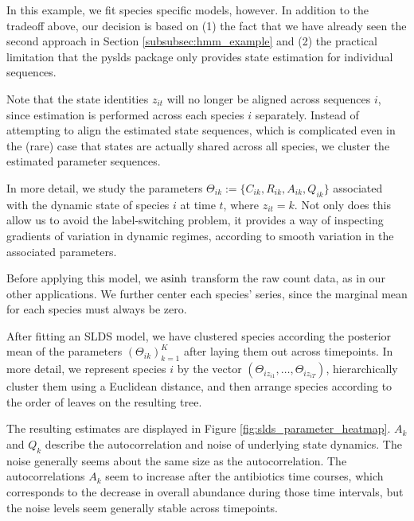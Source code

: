 In this example, we fit species specific models, however. In addition to the
tradeoff above, our decision is based on (1) the fact that we have already seen
the second approach in Section \ref{subsubsec:hmm_example} and (2) the practical
limitation that the pyslds package only provides state estimation for individual
sequences.

Note that the state identities $z_{it}$ will no longer be aligned across
sequences $i$, since estimation is performed across each species $i$ separately.
Instead of attempting to align the estimated state sequences, which is
complicated even in the (rare) case that states are actually shared across all
species, we cluster the estimated parameter sequences.

In more detail, we study the parameters $\Theta_{ik} := \{C_{ik}, R_{ik},
A_{ik}, Q_{ik}\}$ associated with the dynamic state of species $i$ at time $t$,
where $z_{it} = k$. Not only does this allow us to avoid the label-switching
problem, it provides a way of inspecting gradients of variation in dynamic
regimes, according to smooth variation in the associated parameters.

Before applying this model, we $\mathop\mathrm{asinh}$ transform the raw count data, as in our
other applications. We further center each species' series, since the marginal
mean for each species must always be zero.

After fitting an SLDS model, we have clustered species according the posterior
mean of the parameters $\left(\Theta_{ik}\right)_{k =1}^{K}$ after laying them
out across timepoints. In more detail, we represent species $i$ by the vector
$\left(\Theta_{i z_{i1}}, \dots, \Theta_{i z_{iT}}\right)$, hierarchically
cluster them using a Euclidean distance, and then arrange species according to
the order of leaves on the resulting tree.

The resulting estimates are displayed in Figure
\ref{fig:slds_parameter_heatmap}. $A_k$ and $Q_k$ describe the autocorrelation
and noise of underlying state dynamics. The noise generally seems about the same
size as the autocorrelation. The autocorrelations $A_{k}$ seem to increase after
the antibiotics time courses, which corresponds to the decrease in overall
abundance during those time intervals, but the noise levels seem generally
stable across timepoints.

